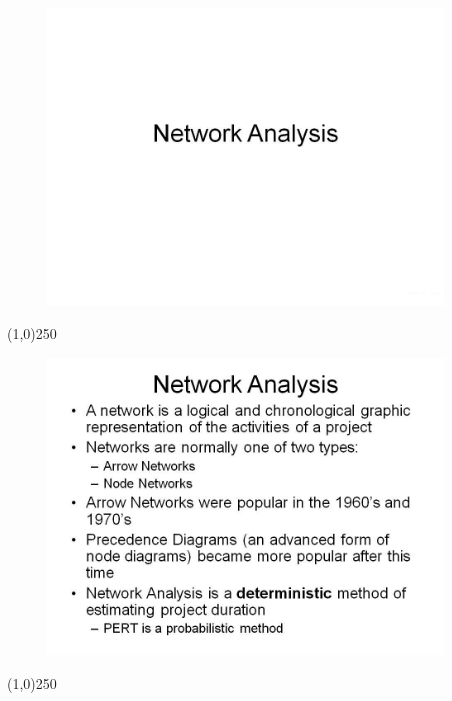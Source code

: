 \begin{frame}
\begin{figure}
	\centering
		\includegraphics[width = 10.5cm]{oldnotes/Slide43.jpg}
\end{figure}
\end{frame}
\begin{center}\line(1,0){250}\end{center}





\begin{frame}
\begin{figure}
	\centering
		\includegraphics[width = 10.5cm]{oldnotes/Slide44.jpg}
\end{figure}
\end{frame}
\begin{center}\line(1,0){250}\end{center}





